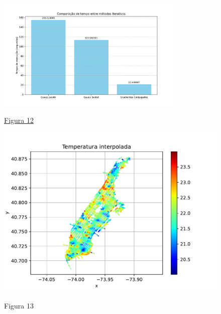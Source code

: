 \documentclass{article}
\begin{document}
    \hypertarget{8}{}
    \begin{figure}[ht]
        \centering
        \includegraphics[width=0.8\textwidth, trim={5px 10px 15px 25px},clip]{../figs/fig12.pdf}
        
        \hyperlink{7}{Figura 12}
    \end{figure}

    \newpage

    \phantom{}

    \vspace{3cm}

    \begin{figure}[ht]
        \centering
        \includegraphics[width=1\textwidth, trim={5px 10px 55px 25px},clip]{../figs/fig13.pdf}
        
        \LARGE{Figura 13}
    \end{figure}

    \newpage
\end{document}
